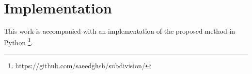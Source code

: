 \section{Implementation} \label{sec:implementation}

This work is accompanied with an implementation of the proposed method in Python \footnote{https://github.com/saeedghsh/subdivision/}.


